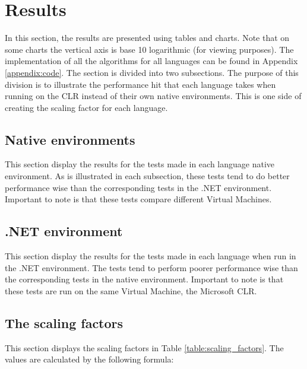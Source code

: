 \section{Results}
In this section, the results are presented using tables and charts. Note that on some charts the vertical axis is base 10 logarithmic (for viewing purposes). The implementation of all the algorithms for all languages can be found in Appendix \ref{appendix:code}. The section is divided into two subsections. The purpose of this division is to illustrate the performance hit that each language takes when running on the CLR instead of their own native environments. This is one side of creating the scaling factor for each language.

\subsection{Native environments}
This section display the results for the tests made in each language native environment. As is illustrated in each subsection, these tests tend to do better performance wise than the corresponding tests in the .NET environment. Important to note is that these tests compare different Virtual Machines.







\subsection{.NET environment} \label{subsec:net_environment}
This section display the results for the tests made in each language when run in the .NET environment. The tests tend to perform poorer performance wise than the corresponding tests in the native environment. Important to note is that these tests are run on the same Virtual Machine, the Microsoft CLR.









\subsection{The scaling factors}
This section displays the scaling factors in Table \ref{table:scaling_factors}. The values are calculated by the following formula:
\newline
\newline
\centerline{  }
\newline
\newline

